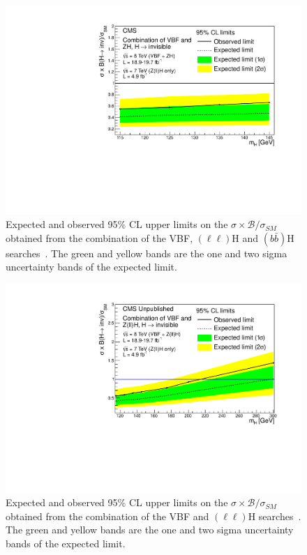 \begin{figure}
  \includegraphics[width=\largefigwidth]{plots/prompt/HIG-13-30-figs/combinedlimit.pdf}
  \caption{Expected and observed 95\% \ac{CL} upper limits on the $\sigma\times\mathcal{B}/\sigma_{SM}$ obtained from the combination of the \ac{VBF}, \PZ$(\ell\ell)$H and \PZ$(b\bar{b})$H searches~\cite{Chatrchyan:2014tja}. The green and yellow bands are the one and two sigma uncertainty bands of the expected limit.}
  \label{fig:promptcomb}
\end{figure}

\begin{figure}
  \includegraphics[width=\largefigwidth]{plots/prompt/HIG-13-30-figs/highmasslimit.pdf}
  \caption{Expected and observed 95\% \ac{CL} upper limits on the $\sigma\times\mathcal{B}/\sigma_{SM}$ obtained from the combination of the \ac{VBF} and \PZ$(\ell\ell)$H searches~\cite{Chatrchyan:2014tja}. The green and yellow bands are the one and two sigma uncertainty bands of the expected limit.}
  \label{fig:promptcombhighmass}
\end{figure}

